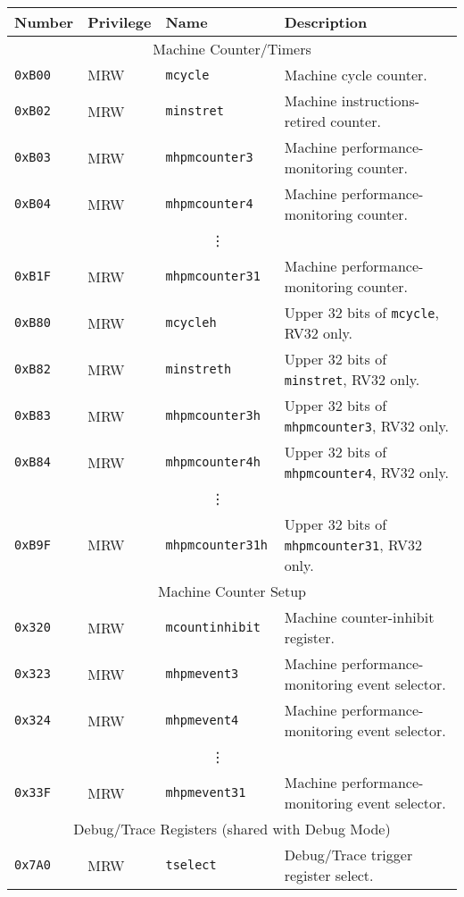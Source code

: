 \begin{table}[htb!]
\begin{center}
\begin{tabular}{|l|l|l|l|}
\hline
Number    & Privilege & Name & Description \\
\hline
\multicolumn{4}{|c|}{Machine Counter/Timers} \\
\hline
\tt 0xB00 & MRW  &\tt mcycle         & Machine cycle counter. \\
\tt 0xB02 & MRW  &\tt minstret       & Machine instructions-retired counter. \\
\tt 0xB03 & MRW  &\tt mhpmcounter3   & Machine performance-monitoring counter. \\
\tt 0xB04 & MRW  &\tt mhpmcounter4   & Machine performance-monitoring counter. \\
& & \multicolumn{1}{c|}{\vdots} & \ \\
\tt 0xB1F & MRW  &\tt mhpmcounter31  & Machine performance-monitoring counter. \\
\tt 0xB80 & MRW  &\tt mcycleh        & Upper 32 bits of {\tt mcycle}, RV32 only. \\
\tt 0xB82 & MRW  &\tt minstreth      & Upper 32 bits of {\tt minstret}, RV32 only. \\
\tt 0xB83 & MRW  &\tt mhpmcounter3h  & Upper 32 bits of {\tt mhpmcounter3}, RV32 only. \\
\tt 0xB84 & MRW  &\tt mhpmcounter4h  & Upper 32 bits of {\tt mhpmcounter4}, RV32 only. \\
& & \multicolumn{1}{c|}{\vdots} & \ \\
\tt 0xB9F & MRW  &\tt mhpmcounter31h & Upper 32 bits of {\tt mhpmcounter31}, RV32 only. \\
\hline
\multicolumn{4}{|c|}{Machine Counter Setup} \\
\hline
\tt 0x320 & MRW  &\tt mcountinhibit  & Machine counter-inhibit register. \\
\tt 0x323 & MRW  &\tt mhpmevent3     & Machine performance-monitoring event selector. \\
\tt 0x324 & MRW  &\tt mhpmevent4     & Machine performance-monitoring event selector. \\
& & \multicolumn{1}{c|}{\vdots} & \ \\
\tt 0x33F & MRW  &\tt mhpmevent31    & Machine performance-monitoring event selector. \\
\hline
\multicolumn{4}{|c|}{Debug/Trace Registers (shared with Debug Mode)} \\
\hline
\tt 0x7A0 & MRW &\tt tselect & Debug/Trace trigger register select. \\

\end{tabular}
\end{center}
\end{table}
